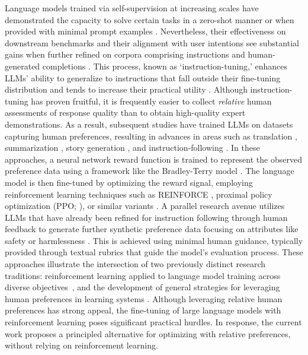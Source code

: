 Language models trained via self-supervision at increasing scales have demonstrated the capacity to solve certain tasks in a zero-shot manner \citep{radford2019language} or when provided with minimal prompt examples \citep{gpt3,megatron,chowdhery2022palm}. Nevertheless, their effectiveness on downstream benchmarks and their alignment with user intentions see substantial gains when further refined on corpora comprising instructions and human-generated completions \citep{mishra-etal-2022-cross,sanh2022multitask,chung2022scaling,thoppilan2022lamda}. This process, known as `instruction-tuning,' enhances LLMs' ability to generalize to instructions that fall outside their fine-tuning distribution and tends to increase their practical utility \citep{chung2022scaling}. Although instruction-tuning has proven fruitful, it is frequently easier to collect \textit{relative} human assessments of response quality than to obtain high-quality expert demonstrations. As a result, subsequent studies have trained LLMs on datasets capturing human preferences, resulting in advances in areas such as translation \citep{kreutzer-etal-2018-reliability}, summarization \citep{stiennon2022learning,ziegler2020finetuning}, story generation \citep{ziegler2020finetuning}, and instruction-following \citep{ouyang2022training,ramamurthy2023is}. In these approaches, a neural network reward function is trained to represent the observed preference data using a framework like the Bradley-Terry model \citep{bradley1952rankanalysis}. The language model is then fine-tuned by optimizing the reward signal, employing reinforcement learning techniques such as REINFORCE \citep{williams1992reinforce}, proximal policy optimization (PPO; \cite{schulman2017proximal}), or similar variants \citep{ramamurthy2023is}. A parallel research avenue utilizes LLMs that have already been refined for instruction following through human feedback to generate further synthetic preference data focusing on attributes like safety or harmlessness \citep{bai2022constitutional}. This is achieved using minimal human guidance, typically provided through textual rubrics that guide the model’s evaluation process. These approaches illustrate the intersection of two previously distinct research traditions: reinforcement learning applied to language model training across diverse objectives~\citep{Ranzato2015SequenceLT,paulus2018a,wu2018learning}, and the development of general strategies for leveraging human preferences in learning systems \citep{christiano2017deep,kupcsik2018learning}. Although leveraging relative human preferences has strong appeal, the fine-tuning of large language models with reinforcement learning poses significant practical hurdles. In response, the current work proposes a principled alternative for optimizing with relative preferences, without relying on reinforcement learning.

